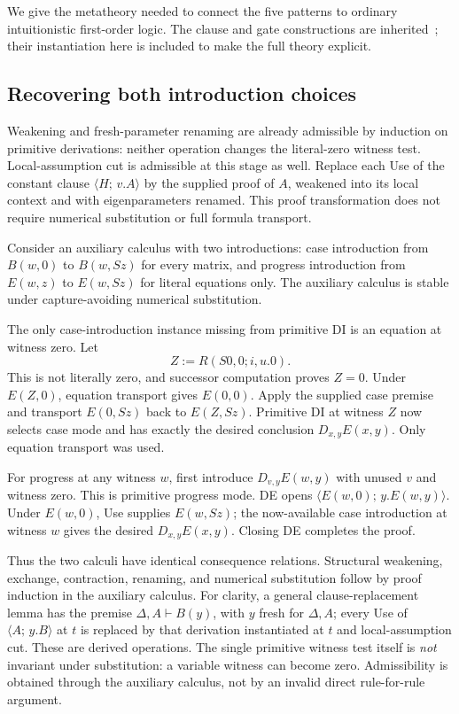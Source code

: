 \documentclass[11pt,letterpaper]{article}
\theoremstyle{definition}
\newcommand{\cl}[2]{\langle #1;\,#2\rangle}
\begin{document}
We give the metatheory needed to connect the five patterns to ordinary
intuitionistic first-order logic. The clause and gate constructions
are inherited~\cite{choice,clausal,raw}; their instantiation here is
included to make the full theory explicit.

\subsection{Recovering both introduction choices}

Weakening and fresh-parameter renaming are already admissible by
induction on primitive derivations: neither operation changes the
literal-zero witness test. Local-assumption cut is admissible at
this stage as well. Replace each Use of the constant clause
$\cl{H}{v.A}$ by the supplied proof of $A$, weakened into its local
context and with eigenparameters renamed. This proof transformation
does not require numerical substitution or full formula transport.

Consider an auxiliary calculus with two introductions: case introduction
from $B(w,0)$ to $B(w,Sz)$ for every matrix, and progress introduction
from $E(w,z)$ to $E(w,Sz)$ for literal equations only. The auxiliary
calculus is stable under capture-avoiding numerical substitution.

The only case-introduction instance missing from primitive DI is an
equation at witness zero. Let
\[
                         Z:=R(S0,0;i,u.0).
\]
This is not literally zero, and successor computation proves $Z=0$.
Under $E(Z,0)$, equation transport gives $E(0,0)$. Apply the supplied
case premise and transport $E(0,Sz)$ back to $E(Z,Sz)$.
Primitive DI at witness $Z$ now selects case mode and has exactly the
desired conclusion $D_{x,y}E(x,y)$. Only equation transport was used.

For progress at any witness $w$, first introduce
$D_{v,y}E(w,y)$ with unused $v$ and witness zero. This is primitive
progress mode. DE opens $\cl{E(w,0)}{y.E(w,y)}$. Under $E(w,0)$,
Use supplies $E(w,Sz)$; the now-available case introduction at witness
$w$ gives the desired $D_{x,y}E(x,y)$. Closing DE completes the proof.

Thus the two calculi have identical consequence relations. Structural
weakening, exchange, contraction, renaming, and numerical substitution
follow by proof induction in the auxiliary calculus. For clarity, a
general clause-replacement lemma has the premise
$\Delta,A\vdash B(y)$, with $y$ fresh for $\Delta,A$; every Use of
$\cl{A}{y.B}$ at $t$ is replaced by that derivation instantiated at
$t$ and local-assumption cut. These are derived operations.
The single primitive witness test itself is \emph{not} invariant under
substitution: a variable witness can become zero. Admissibility is
obtained through the auxiliary calculus, not by an invalid direct
rule-for-rule argument.
\end{document}
